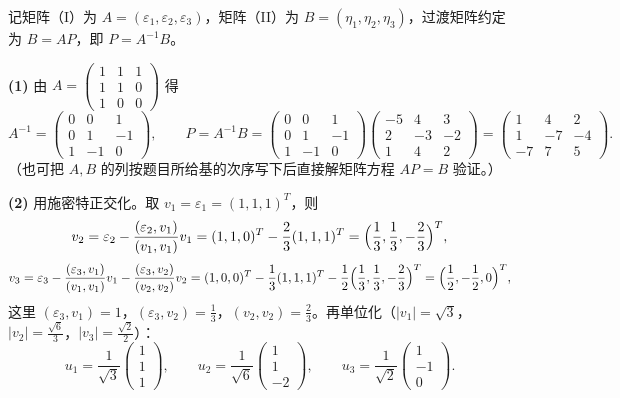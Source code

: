 \begin{solution}
记矩阵（I）为 $A=(\varepsilon_1,\varepsilon_2,\varepsilon_3)$，矩阵（II）为 $B=(\eta_1,\eta_2,\eta_3)$，过渡矩阵约定为 $B=AP$，即 $P=A^{-1}B$。

\textbf{(1)} 由 $A=\begin{pmatrix}1&1&1\\1&1&0\\1&0&0\end{pmatrix}$ 得
\[
A^{-1}=\begin{pmatrix}0&0&1\\0&1&-1\\1&-1&0\end{pmatrix},\qquad
P=A^{-1}B=\begin{pmatrix}0&0&1\\0&1&-1\\1&-1&0\end{pmatrix}
\begin{pmatrix}-5&4&3\\2&-3&-2\\1&4&2\end{pmatrix}
=\begin{pmatrix}1&4&2\\1&-7&-4\\-7&7&5\end{pmatrix}.
\]
（也可把 $A,B$ 的列按题目所给基的次序写下后直接解矩阵方程 $AP=B$ 验证。）

\textbf{(2)} 用施密特正交化。取 $v_1=\varepsilon_1=(1,1,1)^{T}$，则
\[
v_2=\varepsilon_2-\frac{(\varepsilon_2,v_1)}{(v_1,v_1)}v_1=(1,1,0)^{T}-\frac23(1,1,1)^{T}
=\Bigl(\frac13,\frac13,-\frac23\Bigr)^{T},
\]
\[
v_3=\varepsilon_3-\frac{(\varepsilon_3,v_1)}{(v_1,v_1)}v_1-\frac{(\varepsilon_3,v_2)}{(v_2,v_2)}v_2
=(1,0,0)^{T}-\frac13(1,1,1)^{T}-\frac12\Bigl(\frac13,\frac13,-\frac23\Bigr)^{T}
=\Bigl(\frac12,-\frac12,0\Bigr)^{T},
\]
这里 $(\varepsilon_3,v_1)=1$，$(\varepsilon_3,v_2)=\frac13$，$(v_2,v_2)=\frac23$。再单位化（$|v_1|=\sqrt3$，$|v_2|=\frac{\sqrt6}{3}$，$|v_3|=\frac{\sqrt2}{2}$）：
\[
u_1=\frac1{\sqrt3}\begin{pmatrix}1\\1\\1\end{pmatrix},\qquad
u_2=\frac1{\sqrt6}\begin{pmatrix}1\\1\\-2\end{pmatrix},\qquad
u_3=\frac1{\sqrt2}\begin{pmatrix}1\\-1\\0\end{pmatrix}.
\]
\end{solution}

